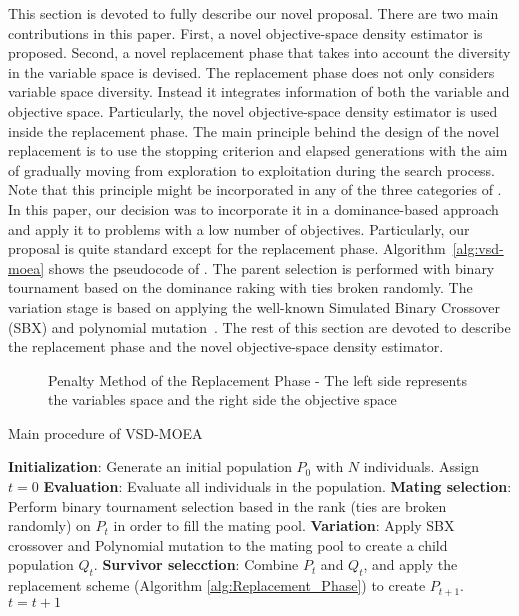 This section is devoted to fully describe our novel proposal.
%
There are two main contributions in this paper.
%
First, a novel objective-space density estimator is proposed.
%
Second, a novel replacement phase that takes into account the diversity in the variable space is devised.
%
The replacement phase does not only considers variable space diversity.
%
Instead it integrates information of both the variable and objective space.
%
Particularly, the novel objective-space density estimator is used inside the replacement phase.
%
The main principle behind the design of the novel replacement is to use the stopping criterion and 
elapsed generations with the aim of gradually moving from exploration to exploitation during the search process.
%
Note that this principle might be incorporated in any of the three categories of \MOEAS{}.
%
In this paper, our decision was to incorporate it in a dominance-based approach and apply it to problems with 
a low number of objectives.
%
Particularly, our proposal is quite standard except for the replacement phase.
%
Algorithm~\ref{alg:vsd-moea} shows the pseudocode of \VSDMOEA{}.
%
The parent selection is performed with binary tournament based on the dominance raking with ties broken randomly.
%
The variation stage is based on applying the well-known Simulated Binary Crossover (SBX) 
and polynomial mutation~\cite{Joel:SBX1994, Joel:Mutation}.
%
The rest of this section are devoted to describe the replacement phase and the novel objective-space density 
estimator.

\begin{figure}[t]
\centering

\caption{Penalty Method of the Replacement Phase - The left side represents the variables space and the right side the 
objective space} \label{fig:Hypersphere}
\end{figure}

\begin{algorithm}[t]
  \scriptsize
	\caption{Main procedure of VSD-MOEA} 
\begin{algorithmic}[1]
 	\STATE \textbf{Initialization}: Generate an initial population $P_0$ with $N$ individuals.
	\STATE Assign $t=0$
	   \STATE \textbf{Evaluation}: Evaluate all individuals in the population.
	   \STATE \textbf{Mating selection}: Perform binary tournament selection based in the rank (ties are broken randomly) on $P_t$ in order to fill the mating pool.
	   \STATE \textbf{Variation}: Apply SBX crossover and Polynomial mutation to the mating pool to create a child population $Q_t$.
	   \STATE \textbf{Survivor selecction}: Combine $P_t$ and $Q_t$, and apply the replacement scheme (Algorithm \ref{alg:Replacement_Phase}) to create $P_{t+1}$.
	   \STATE $t=t+1$
	\ENDWHILE
	\end{algorithmic}
\label{alg:vsd-moea}
\end{algorithm}



